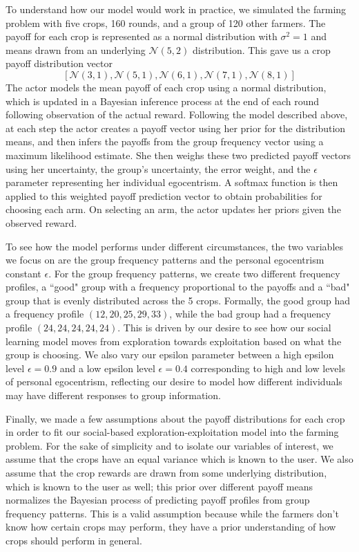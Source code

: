 \documentclass[11pt, a4paper]{article}
\begin{document}
To understand how our model would work in practice, we simulated the farming problem with five crops, 160 rounds, and a group of 120 other farmers. The payoff for each crop is represented as a normal distribution with $\sigma^2 = 1$ and means drawn from an underlying $\mathcal{N}(5, 2)$ distribution. This gave us a crop payoff distribution vector $$[\mathcal{N}(3, 1), \mathcal{N}(5, 1), \mathcal{N}(6, 1), \mathcal{N}(7, 1), \mathcal{N}(8, 1)]$$ The actor models the mean payoff of each crop using a normal distribution, which is updated in a Bayesian inference process at the end of each round following observation of the actual reward. Following the model described above, at each step the actor creates a payoff vector using her prior for the distribution means, and then infers the payoffs from the group frequency vector using a maximum likelihood estimate. She then weighs these two predicted payoff vectors using her uncertainty, the group's uncertainty, the error weight, and the $\epsilon$ parameter representing her individual egocentrism. A softmax function is then applied to this weighted payoff prediction vector to obtain probabilities for choosing each arm. On selecting an arm, the actor updates her priors given the observed reward. 

To see how the model performs under different circumstances, the two variables we focus on are the group frequency patterns and the personal egocentrism constant $\epsilon$. For the group frequency patterns, we create two different frequency profiles, a ``good" group with a frequency proportional to the payoffs and a ``bad" group that is evenly distributed across the 5 crops. Formally, the good group had a frequency profile $(12, 20, 25, 29, 33)$, while the bad group had a frequency profile $(24, 24, 24, 24, 24)$. This is driven by our desire to see how our social learning model moves from exploration towards exploitation based on what the group is choosing. We also vary our epsilon parameter between a high epsilon level $\epsilon = 0.9$ and a low epsilon level $\epsilon = 0.4$ corresponding to high and low levels of personal egocentrism, reflecting our desire to model how different individuals may have different responses to group information. 

Finally, we made a few assumptions about the payoff distributions for each crop in order to fit our social-based exploration-exploitation model into the farming problem. For the sake of simplicity and to isolate our variables of interest, we assume that the crops have an equal variance which is known to the user. We also assume that the crop rewards are drawn from some underlying distribution, which is known to the user as well; this
prior over different payoff means normalizes the Bayesian process of predicting payoff profiles from group frequency patterns. This is a valid assumption because while the farmers don't know how certain crops may perform, they have a prior understanding of how crops should perform in general.  
\end{document}
